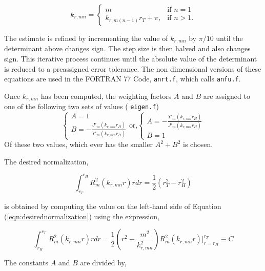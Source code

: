 \documentclass[12pt]{article}
\begin{document}
 \begin{equation}
     k_{r,mn} = 
    \begin{cases}
        m & \text{if } n = 1\\
        k_{r,m(n-1)} r_T + \pi,              & \text{if }  n > 1.
    \end{cases}
 \end{equation}

 The estimate is refined by incrementing the value of $k_{r,mn}$ by $\pi/10$ until
 the determinant above changes sign. The step size is then halved and also changes 
 sign. This iterative process continues until the absolute value of the determinant 
 is reduced to a preassigned error tolerance. The non dimensional versions
 of these equations are used in the FORTRAN 77 Code, \verb|anrt.f|, which calls 
 \verb|anfu.f|.

 Once $k_{r,mn}$ has been computed, the weighting factors $A$ and $B$ are assigned to 
 one of the following two sets of values ( \verb|eigen.f|)
 \begin{equation*}
     \begin{cases}
         A = 1 \\ 
         B = - \frac{J'_m(k_{r,mn} r_H )}{Y'_m(k_{r,mn} r_H )}
     \end{cases}
     \text{or,}
     \begin{cases}
         A =- \frac{Y'_m(k_{r,mn} r_H )}{J'_m(k_{r,mn} r_H )}  \\
         B = 1
     \end{cases}
 \end{equation*}
Of these two values, which ever has the smaller $A^2 + B^2$ is chosen.

The desired normalization,

\begin{equation}
    \int_{r_T}^{r_H} R_m^2(k_{r,mn} r) r dr = \frac{1}{2}\left( r_T^2-r_H^2 \right)
    \label{eqn:desirednormalization}
\end{equation}

is obtained by computing the value on the left-hand side of 
Equation (\ref{eqn:desirednormalization}) using the expression,

\begin{equation}
    \int_{r_H}^{r_T} R_m^2(k_{r,mn} r) r dr = 
    \frac{1}{2}\left( r^2 - \frac{m^2}{k_{r,mn}^2} \right)R_m^2 (k_{r,mn} r)\Big|_{r = r_H}^{r_T} \equiv C
\end{equation}

The constants $A$ and $B$ are divided by,
\end{document}
